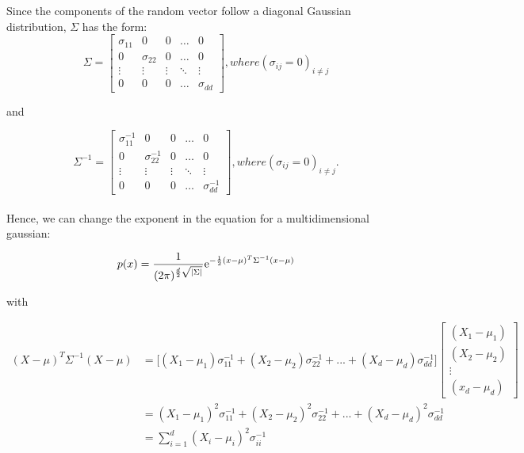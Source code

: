 \documentclass{amsart}
\theoremstyle{definition}
\theoremstyle{remark}
\numberwithin{equation}{section}
\begin{document}
Since the components of the random vector follow a diagonal Gaussian distribution,
$\Sigma$ has the form: \\

\begin{equation}
    \Sigma = \begin{bmatrix}
        \sigma_{11} &           0 &      0 & \dots  & 0 \\
                  0 & \sigma_{22} &      0 & \dots  & 0 \\
             \vdots &      \vdots & \vdots & \ddots & \vdots \\
                  0 &           0 &      0 & \dots  & \sigma_{dd}
    \end{bmatrix}, where (\sigma_{ij}=0)_{i \neq j}
\end{equation}

and

\begin{equation}
    \Sigma^{-1} = \begin{bmatrix}
        \sigma_{11}^{-1} &           0 &      0 & \dots  & 0 \\
                  0 & \sigma_{22}^{-1} &      0 & \dots  & 0 \\
             \vdots &      \vdots & \vdots & \ddots & \vdots \\
                  0 &           0 &      0 & \dots  & \sigma_{dd}^{-1}
    \end{bmatrix}, where (\sigma_{ij}=0)_{i \neq j}.
\end{equation}\\

Hence, we can change the exponent in the equation for a multidimensional gaussian:

\begin{equation}
    p(x) = \frac{1}{(2\pi)^{\frac{d}{2} \sqrt{|\Sigma|}}} {\rm e}^{-\frac{1}{2}(x-\mu)^T \Sigma^{-1} (x-\mu)}   
\end{equation}

with 

\begin{equation}
    \begin{align}
    (X-\mu)^T \Sigma^{-1} (X-\mu) & = \big[(X_1-\mu_1)\sigma_{11}^{-1} + (X_2-\mu_2)\sigma_{22}^{-1} + ... + (X_d-\mu_d)\sigma_{dd}^{-1}\big] \begin{bmatrix}
           (X_1-\mu_1) \\
           (X_2-\mu_2) \\
           \vdots \\
           (x_d-\mu_d)
        \end{bmatrix} \\
    & = (X_1-\mu_1)^2 \sigma_{11}^{-1} + (X_2-\mu_2)^2 \sigma_{22}^{-1} + ... + (X_d-\mu_d)^2 \sigma_{dd}^{-1} \\
    & = \sum_{i=1}^{d}(X_i-\mu_i)^2 \sigma_{ii}^{-1}
    \end{align}
\end{equation}
\end{document}
